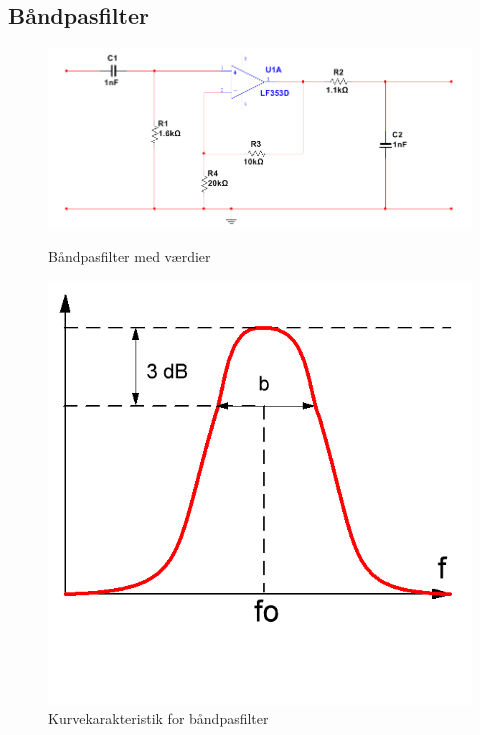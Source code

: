 \newpage

\subsection{Båndpasfilter}

\begin{figure}[htb]
  \begin{minipage}{0.45\textwidth}
    \centering
      \includegraphics[width=\textwidth]{billeder/HWdesign/BAANDPAS_MV}
      \caption{Båndpasfilter med værdier}
    \label{fig:BAANDPAS_MV}
  \end{minipage}
  \hspace{0.1\textwidth}
  \begin{minipage}{0.45\textwidth}
    \centering
      \includegraphics[width=\textwidth]{billeder/HWdesign/BAANDPAS_KURVE}
      \caption{Kurvekarakteristik for båndpasfilter}
    \label{fig:BAANDPAS_KURVE}
  \end{minipage}
\end{figure}

